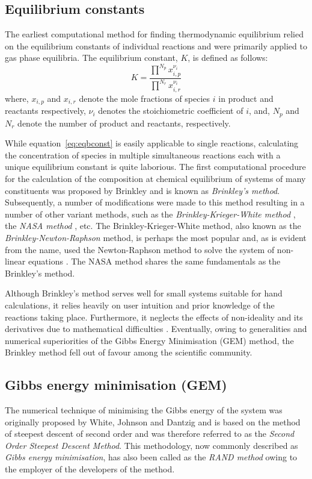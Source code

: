 	\subsection{Equilibrium constants}
	The earliest computational method for finding thermodynamic equilibrium relied on the equilibrium constants of individual reactions and were primarily applied to gas phase equilibria. The equilibrium constant, $K$, is defined as follows:
	\begin{equation}\label{eq:eqbconst}
		K = \frac{\prod^{N_p} x_{i,p}^{\nu_i}}{\prod^{N_r} x_{i,r}^{\nu_i}}
	\end{equation}
	where, $x_{i,p}$ and $x_{i,r}$ denote the mole fractions of species $i$ in product and reactants respectively, $\nu_i$ denotes the stoichiometric coefficient of $i$, and, $N_p$ and $N_r$ denote the number of product and reactants, respectively.

	While equation~\eqref{eq:eqbconst} is easily applicable to single reactions, calculating the concentration of species in multiple simultaneous reactions each with a unique equilibrium constant is quite laborious. The first computational procedure for the calculation of the composition at chemical equilibrium of systems of many constituents was proposed by Brinkley \cite{Brinkley:1947aa} and is known as \emph{Brinkley's method}. Subsequently, a number of modifications were made to this method resulting in a number of other variant methods, such as the \emph{Brinkley-Krieger-White method} \cite{Krieger:1948aa}, the \emph{NASA method} \cite{Zeleznik:1968aa}, etc. The Brinkley-Krieger-White method, also known as the \emph{Brinkley-Newton-Raphson} method, is perhaps the most popular and, as is evident from the name, used the Newton-Raphson method to solve the system of non-linear equations \cite{vanZeggeren11}. The NASA method \cite{Zeleznik:1968aa} shares the same fundamentals as the Brinkley's method.

	Although Brinkley's method serves well for small systems suitable for hand calculations, it relies heavily on user intuition and prior knowledge of the reactions taking place. Furthermore, it neglects the effects of non-ideality and its derivatives due to mathematical difficulties \cite{Zeleznik:1968aa}. Eventually, owing to generalities and numerical superiorities of the Gibbs Energy Minimisation (GEM) method, the Brinkley method fell out of favour among the scientific community.

	\subsection{Gibbs energy minimisation (GEM)}
	The numerical technique of minimising the Gibbs energy of the system was originally proposed by White, Johnson and Dantzig \cite{White:58} and is based on the method of steepest descent of second order and was therefore referred to as the \emph{Second Order Steepest Descent Method}. This methodology, now commonly described as \emph{Gibbs energy minimisation}, has also been called as the \emph{RAND method} owing to the employer of the developers of the method.

